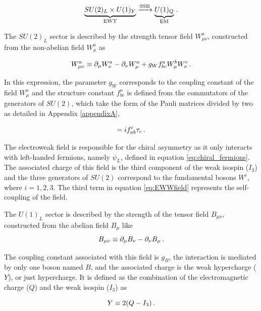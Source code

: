 \begin{equation}
    \underbrace{SU(2)_L \times U(1)_Y}_\text{EWT} \xrightarrow{\text{SSB}} \underbrace{U(1)_Q}_{\text{EM}} \mend
\end{equation}

The $SU(2)_L$ sector is described by the strength tensor field $W_{\mu\nu}^a$, constructed from the non-abelian field $W_{\mu}^a$ as

\begin{equation}
    W_{\mu\nu}^a \equiv \partial_{\mu} W_{\nu}^a - \partial_{\nu} W_{\mu}^a + g_W f_{bc}^a W_{\mu}^b W_{\nu}^c \mend
    \label{eq:EWWfield}
\end{equation}

In this expression, the parameter $g_W$ corresponds to the coupling constant of the field $W_{\mu}^a$ and the structure constant $f_{bc}^a$ is defined from the commutators of the generators of $SU(2)$, which take the form of the Pauli matrices divided by two as detailed in Appendix \ref{appendixA},

\begin{equation}
    [\tau_a , \tau_b] = if_{ab}^c \tau_c \mend
\end{equation}

The electroweak field is responsible for the chiral asymmetry as it only interacts with left-handed fermions, namely $\psi_L$, defined in equation \ref{eq:chiral_fermions}. The associated charge of this field is the third component of the weak isospin ($I_3$) and the three generators of $SU(2)$ correspond to the fundamental bosons $W^i$, where $i = {1,2,3}$. The third term in equation \ref{eq:EWWfield} represents the self-coupling of the field.

The $U(1)_L$ sector is described by the strength of the tensor field $B_{\mu\nu}$, constructed from the abelian field $B_{\mu}$ like
\begin{equation}
    B_{\mu\nu} \equiv \partial_{\mu}B_{\nu} - \partial_{\nu}B_{\mu} \mend
\end{equation}

The coupling constant associated with this field is $g_B$, the interaction is mediated by only one boson named $B$, and the associated charge is the weak hypercharge ($Y$), or just hypercharge. It is defined as the combination of the electromagnetic charge ($Q$) and the weak isospin ($I_3$) as

\begin{equation}
    Y \equiv 2(Q - I_3) \mend
\end{equation}

